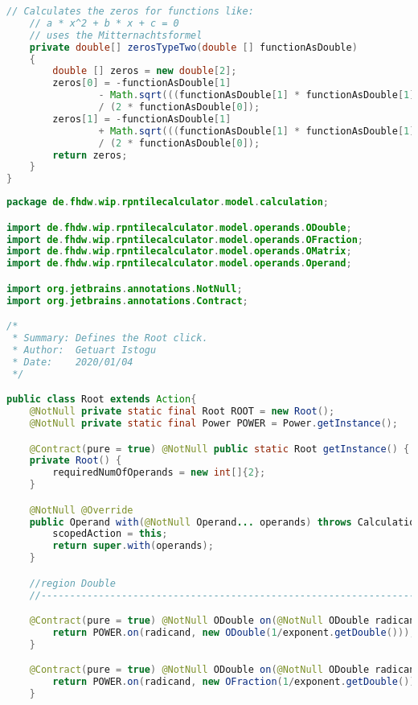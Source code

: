 \begin{lstlisting}[caption=Zeros (Keienburg),label=list:Zeros,language=Java]
    // Calculates the zeros for functions like:
    // a * x^2 + b * x + c = 0
    // uses the Mitternachtsformel
    private double[] zerosTypeTwo(double [] functionAsDouble)
    {
        double [] zeros = new double[2];
        zeros[0] = -functionAsDouble[1]
                - Math.sqrt(((functionAsDouble[1] * functionAsDouble[1]) - (4 * functionAsDouble[0] * functionAsDouble[2])) )
                / (2 * functionAsDouble[0]);
        zeros[1] = -functionAsDouble[1]
                + Math.sqrt(((functionAsDouble[1] * functionAsDouble[1]) - (4 * functionAsDouble[0] * functionAsDouble[2])) )
                / (2 * functionAsDouble[0]);
        return zeros;
    }
}
\end{lstlisting}    

\begin{lstlisting}[caption=Root (Istogu),label=list:Root,language=Java]
package de.fhdw.wip.rpntilecalculator.model.calculation;

import de.fhdw.wip.rpntilecalculator.model.operands.ODouble;
import de.fhdw.wip.rpntilecalculator.model.operands.OFraction;
import de.fhdw.wip.rpntilecalculator.model.operands.OMatrix;
import de.fhdw.wip.rpntilecalculator.model.operands.Operand;

import org.jetbrains.annotations.NotNull;
import org.jetbrains.annotations.Contract;

/*
 * Summary: Defines the Root click.
 * Author:  Getuart Istogu
 * Date:    2020/01/04
 */

public class Root extends Action{
    @NotNull private static final Root ROOT = new Root();
    @NotNull private static final Power POWER = Power.getInstance();

    @Contract(pure = true) @NotNull public static Root getInstance() { return ROOT; }
    private Root() {
        requiredNumOfOperands = new int[]{2};
    }

    @NotNull @Override
    public Operand with(@NotNull Operand... operands) throws CalculationException {
        scopedAction = this;
        return super.with(operands);
    }

    //region Double
    //------------------------------------------------------------------------------------

    @Contract(pure = true) @NotNull ODouble on(@NotNull ODouble radicand, @NotNull ODouble exponent) {
        return POWER.on(radicand, new ODouble(1/exponent.getDouble()));
    }

    @Contract(pure = true) @NotNull ODouble on(@NotNull ODouble radicand, @NotNull OFraction exponent){
        return POWER.on(radicand, new OFraction(1/exponent.getDouble()));
    }


\end{lstlisting}
